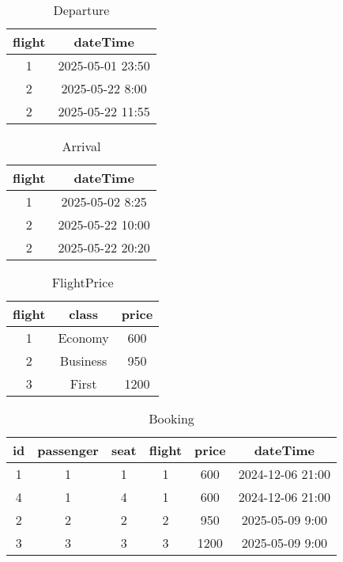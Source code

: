 \begin{table}[h!] 
\centering          
\begin{tabular}{|c|c|} 
\hline             
flight & dateTime \\ 
\hline
1 & 2025-05-01 23:50 \\ 
\hline
2 & 2025-05-22 8:00 \\ 
\hline
2 & 2025-05-22 11:55 \\ 
\hline
\end{tabular}
\caption{Departure} 
\label{tab:example} 
\end{table}

\begin{table}[h!] 
\centering          
\begin{tabular}{|c|c|} 
\hline             
flight & dateTime \\ 
\hline
1 & 2025-05-02 8:25 \\ 
\hline
2 & 2025-05-22 10:00 \\ 
\hline
2 & 2025-05-22 20:20 \\ 
\hline
\end{tabular}
\caption{Arrival} 
\label{tab:example} 
\end{table}

\begin{table}[h!]
\centering         
\begin{tabular}{|c|c|c|} 
\hline             
flight & class & price \\ 
\hline
1 & Economy & 600 \\ 
\hline
2 & Business & 950 \\
\hline
3 & First & 1200 \\ 
\hline
\end{tabular}
\caption{FlightPrice} 
\label{tab:example} 
\end{table}

\begin{table}[h!]
\centering         
\begin{tabular}{|c|c|c|c|c|c|} 
\hline             
id & passenger & seat & flight & price & dateTime \\ 
\hline
1 & 1 & 1 & 1 & 600 & 2024-12-06 21:00\\ 
\hline
4 & 1 & 4 & 1 & 600 & 2024-12-06 21:00\\ 
\hline
2 & 2 & 2 & 2 & 950 & 2025-05-09 9:00\\
\hline
3 & 3 & 3 & 3 & 1200 & 2025-05-09 9:00\\ 
\hline
\end{tabular}
\caption{Booking} 
\label{tab:example} 
\end{table}
